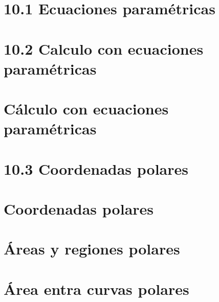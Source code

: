 \documentclass{book}
\begin{document}
\chapter{10.1 Ecuaciones paramétricas } 

\chapter{10.2 Calculo con ecuaciones paramétricas } 

\chapter{ Cálculo con ecuaciones paramétricas } 


\chapter{ 10.3 Coordenadas polares } 

\chapter{ Coordenadas polares } 

\chapter{ Áreas y regiones polares } 

\chapter{ Área entra curvas polares } 

\end{document}
